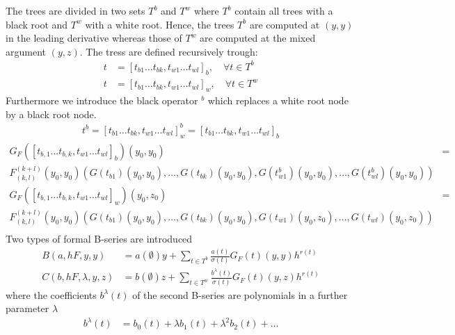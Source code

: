\documentclass[english,unicode]{article}
\begin{document}
The trees are divided in two sets $T^b$ and $T^w$ where $T^b$ contain all trees with a black root and
 $T^w$ with a white root. Hence, the trees $T^b$ are computed at $(y,y)$ in the leading derivative whereas those of $T^w$ are computed at the mixed argument $(y,z)$. The tress  are defined recursively trough:
\begin{align*}
t & = [t_{b1}\ldots t_{bk},t_{w1}\ldots t_{wl}]_b, \quad \forall t \in T^b\\
t & = [t_{b1}\ldots t_{bk},t_{w1}\ldots t_{wl}]_w, \quad \forall t \in T^w
\end{align*}
Furthermore we introduce the black operator $^b$ which replaces a white root node by a black root node. 
\begin{align*}
t^b=[t_{b1}\ldots t_{bk},t_{w1}\ldots t_{wl}]_w^b=[t_{b1}\ldots t_{bk},t_{w1}\ldots t_{wl}]_b
\end{align*}
\begin{align*}
G_F( [t_{b,1}\ldots t_{b,k},t_{w1}\ldots t_{wl}]_b)(y_0,y_0) & =\\
F^{(k+l)}_{(k,l)}(y_0,y_0)(G(t_{b1})(y_0,y_0),\ldots,G(t_{bk})(y_0,y_0),G(t_{w1}^b)(y_0,y_0),\ldots,G(t_{wl}^b)(y_0,y_0))\\
G_F([t_{b,1}\ldots t_{b,k},t_{w1}\ldots t_{wl}]_w)(y_0,z_0) & = \\
F^{(k+l)}_{(k,l)}(y_0,y_0)(G(t_{b1})(y_0,y_0),\ldots,G(t_{bk})(y_0,y_0),G(t_{w1})(y_0,z_0),\ldots,G(t_{wl})(y_0,z_0))\\
\end{align*}
Two types of formal B-series are introduced
\begin{align*}
B(a,hF,y,y) & = a(\emptyset)y+\sum_{t\in T^b} \frac{a(t)}{\sigma(t)}G_F(t)(y,y)h^{r(t)}\\
C(b,hF,\lambda,y,z) & = b(\emptyset)z+\sum_{t\in T^w} \frac{b^{\lambda}(t)}{\sigma(t)}G_F(t)(y,z)h^{r(t)}
\end{align*}
where the coefficients $b^{\lambda}(t)$ of the second B-series  are polynomials in a further parameter $\lambda$
\begin{align*}
b^{\lambda}(t) & = b_0(t)+\lambda b_1(t)+\lambda^2 b_2(t)+\ldots
\end{align*}
\end{document}
